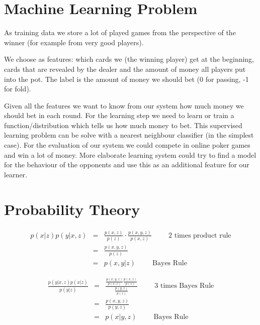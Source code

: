 \section*{Machine Learning Problem}
As training data we store a lot of played games from the perspective of the winner (for example from very good players). 

We choose as features: which cards we (the winning player) get at the beginning, cards that are revealed by the dealer and the amount of money all players put into the pot. The label is the amount of money we should bet (0 for passing, -1 for fold).

Given all the features we want to know from our system how much money we should bet in each round. For the learning step we need to learn or train a function/distribution which tells us how much money to bet. This supervised learning problem can be solve with a nearest neighbour classifier (in the simplest case). For the evaluation of our system we could compete in online poker games and win a lot of money. More elaborate learning system could try to find a model for the behaviour of the opponents and use this as an additional feature for our learner. 



\section*{Probability Theory}

\begin{eqnarray} 
    p(x|z)p(y|x,z) &=&  \frac{p(x,z)}{p(z)}\cdot \frac{p(x,y,z)}{p(x,z)} \hspace{1cm}\mbox{2 times product rule}\\
    &=&  \frac{p(x,y,z)}{p(z)} \\
    &=&  p(x,y|z) \hspace{1cm} \mbox{Bayes Rule}
\end{eqnarray}

\begin{eqnarray}
    \frac{p(y| x,z)p(x|z)}{p(y|z)}&=& \frac{\frac{p(x,y,z)}{p(x,z)} \frac{p(x,z)}{p(z)}}{\frac{p(y,z)}{p(z)}} \hspace{1cm}\mbox{3 times Bayes Rule}\\
    &=& \frac{p(x,y,z)}{p(y,z)} \\
    &=& p(x|y,z) \hspace{1cm}\mbox{Bayes Rule}
\end{eqnarray}


